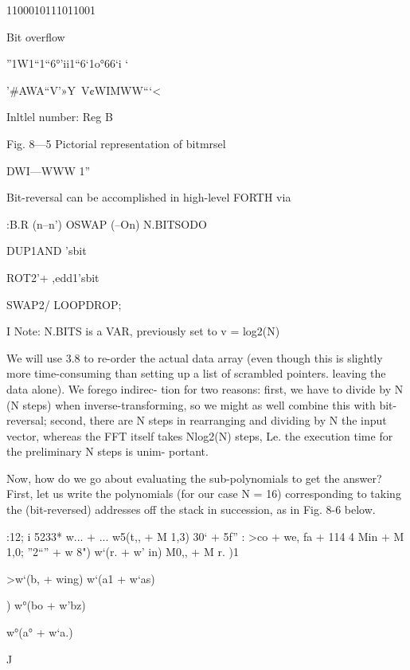 {{{{{{{{1100010111011001

Bit overﬂow

”1W1“1“6°’ii1“6‘1o°66‘i ‘

'#AWA“V’»Y~V¢WIMWW“‘<%

Inltlel number: Reg B

 

 

 

 

 

Fig. 8—5 Pictorial representation of bitmrsel

DWI—WWW 1”

Bit-reversal can be accomplished in high-level FORTH via

:B.R (n--n') \reverseorderoibits
OSWAP (--On) \eetupstack
N.BITSODO

DUP1AND 'sbit

ROT2'+ ,edd1'sbit

SWAP2/ \rightoshittn
LOOPDROP;

I Note: N.BITS is a VAR, previously set to v = log2(N)

We will use 3.8 to re-order the actual data array (even though
this is slightly more time-consuming than setting up a list of
scrambled pointers. leaving the data alone). We forego indirec-
tion for two reasons: ﬁrst, we have to divide by N (N steps) when
inverse-transforming, so we might as well combine this with
bit-reversal; second, there are N steps in rearranging and dividing
by N the input vector, whereas the FFT itself takes Nlog2(N)
steps, Le. the execution time for the preliminary N steps is unim-
portant.

Now, how do we go about evaluating the sub-polynomials to get
the answer? First, let us write the polynomials (for our case
N = 16) corresponding to taking the (bit-reversed) addresses off
the stack in succession, as in Fig. 8-6 below.

 

 

:12; i 5233* w... + ...
w5(t,, + M 1,3)
30‘ + 5f” : >co + we,
fa + 114 4
Min + M 1,0; ”2“” + w 8")
w‘(r. + w’ in)
M0,, + M r. )1

>w‘(b, + wing)
w‘(a1 + w‘as)

) w°(bo + w’bz)

w°(a° + w‘a.)

 

 

 

J

}}}}}}}}
